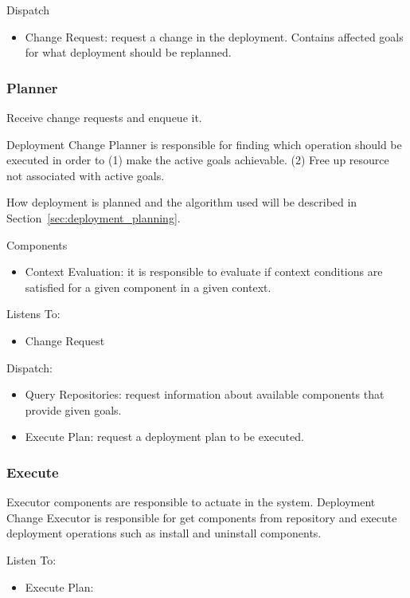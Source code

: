 Dispatch
\begin{itemize}
  \item Change Request: request a change in the deployment. Contains affected goals for what deployment should be replanned.
\end{itemize}

\subsubsection{Planner}

Receive change requests and enqueue it.

Deployment Change Planner is responsible for finding which operation should be executed in order to (1) make the active goals achievable. (2) Free up resource not associated with active goals.

How deployment is planned and the algorithm used will be described in Section~\ref{sec:deployment_planning}.

Components
\begin{itemize}
  \item Context Evaluation: it is responsible to evaluate if context conditions are satisfied for a given component in a given context.
\end{itemize}

Listens To:
\begin{itemize}
  \item Change Request
\end{itemize}

Dispatch:
\begin{itemize}
  \item Query Repositories: request information about available components that provide given goals.
  \item Execute Plan: request a deployment plan to be executed.
\end{itemize}



\subsubsection{Execute}

Executor components are responsible to actuate in the system.
Deployment Change Executor is responsible for get components from repository and execute deployment operations such as install and uninstall components.



Listen To:
\begin{itemize}
  \item Execute Plan:
\end{itemize}
